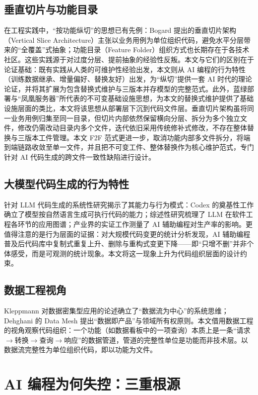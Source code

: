 \documentclass[11pt,a4paper]{ctexart}
\begin{document}
\subsection{垂直切片与功能目录}
在工程实践中，“按功能纵切”的思想已有先例：Bogard 提出的垂直切片架构（Vertical Slice Architecture）主张以业务用例为单位组织代码，避免水平分层带来的“全覆盖”式抽象\cite{ref7}；功能目录（Feature Folder）组织方式也长期存在于各技术社区。这些实践源于对过度分层、提前抽象的经验性反叛。本文与它们的区别在于论证基础：既有实践从人类的可维护性经验出发，本文则从 AI 编程的行为特性（训练数据继承、增量偏好、替换友好）出发，为“纵切”提供一套 AI 时代的理论论证，并将其扩展为包含替换式维护与三版本并存模型的完整范式。此外，蓝绿部署与“凤凰服务器”所代表的不可变基础设施思想\cite{ref8,ref9}，为本文的替换式维护提供了基础设施层面的类比，本文将该思想从部署层下沉到代码文件层。垂直切片架构虽将同一业务用例归集至同一目录，但切片内部依然保留横向分层、拆分为多个独立文件，修改仍需改动目录内多个文件，迭代依旧采用传统修补式修改，不存在整体替换与三版本工件管理。本文 F2F 范式更进一步，取消功能内部多文件拆分，将端到端链路收敛至单一文件，并且把不可变工件、整体替换作为核心维护范式，专门针对 AI 代码生成的跨文件一致性缺陷进行设计。

\subsection{大模型代码生成的行为特性}
针对 LLM 代码生成的系统性研究揭示了其能力与行为模式：Codex 的奠基性工作确立了模型按自然语言生成可执行代码的能力\cite{ref10}；综述性研究梳理了 LLM 在软件工程各环节的应用图谱\cite{ref11}；产业界的实证工作测量了 AI 辅助编程对生产率的影响\cite{ref1}。更值得注意的是行为层面的证据：对大规模代码变更的统计分析发现，AI 辅助编程普及后代码库中复制式重复上升、删除与重构式变更下降\cite{ref2}——即“只增不删”并非个体感受，而是可观测的统计现象。本文将这一现象上升为代码组织层面的设计约束。

\subsection{数据工程视角}
Kleppmann 对数据密集型应用的论述确立了“数据流为中心”的系统思维\cite{ref12}；Dehghani 的 Data Mesh 提出“数据即产品”与领域所有权原则\cite{ref13}。本文借用数据工程的视角观察代码组织：一个功能（如数据看板中的一项查询）本质上是一条“请求$\rightarrow$转换$\rightarrow$查询$\rightarrow$响应”的数据管道，管道的完整性单位是功能而非技术层。以数据流完整性为单位组织代码，即以功能为文件。

\section{AI 编程为何失控：三重根源}
\end{document}
